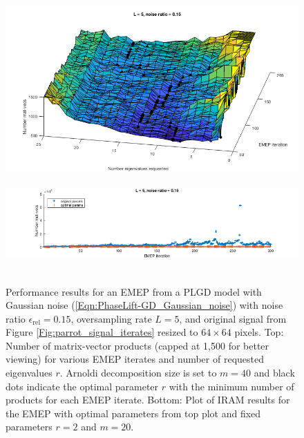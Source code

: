 \begin{figure}[H]
\centering
\hbox{\hspace{-0.2cm} \includegraphics[scale=0.6]{Numerics-num_matvecs_orig_vs_optimal_params_1} }\vspace{1.0cm}
\hbox{\hspace{-0.8cm} \includegraphics[scale=0.6]{Numerics-num_matvecs_orig_vs_optimal_params_2} }\vspace{0.0cm}
	\caption{
Performance results for an EMEP from a PLGD model with Gaussian noise	(\ref{Eqn:PhaseLift-GD_Gaussian_noise}) with noise ratio $\epsilon_\text{rel} = 0.15$, oversampling rate $L = 5$, and original signal from Figure \ref{Fig:parrot_signal_iterates} resized to $64 \times 64$ pixels.
Top: Number of matrix-vector products (capped at 1,500 for better viewing) for various EMEP iterates and number of requested eigenvalues $r$.  
Arnoldi decomposition size is set to $m = 40$ and black dots indicate the optimal parameter $r$ with the minimum number of products for each EMEP iterate.
Bottom: Plot of IRAM results for the EMEP with optimal parameters from top plot and fixed parameters $r=2$ and $m=20$.
	}
\label{Fig:Numerics-num_matvecs_orig_vs_optimal_params}
\end{figure}




